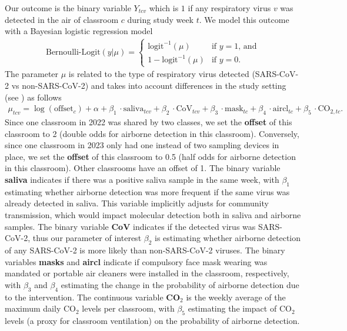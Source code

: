 \documentclass[fleqn,11pt]{wlscirep_supp}
\begin{document}
Our outcome is the binary variable $Y_{tcv}$ which is $1$ if any respiratory virus $v$ was detected in the air of classroom $c$ during study week $t$. We model this outcome with a Bayesian logistic regression model
\begin{align}
    \text{Bernoulli-Logit}(y|\mu) = \begin{cases}
        \text{logit}^{-1}(\mu) & \text{if }y=1\text{, and} \\
        1-\text{logit}^{-1}(\mu) & \text{if }y=0.
    \end{cases}
\end{align}
The parameter $\mu$ is related to the type of respiratory virus detected (SARS-CoV-2 vs non-SARS-CoV-2) and takes into account differences in the study setting (see ) as follows
\begin{align}
    \mu_{tcv} = \log(\text{offset}_c) + \alpha + \beta_1\,\cdot\text{saliva}_{tcv} + \beta_2\,\cdot\text{CoV}_{tcv} + \beta_3\,\cdot\text{mask}_{tc} + \beta_4\,\cdot\text{aircl}_{tc} + \beta_5\,\cdot\text{CO}_{2,tc}.
\end{align}
Since one classroom in 2022 was shared by two classes, we set the \textbf{offset} of this classroom to 2 (double odds for airborne detection in this classroom). Conversely, since one classroom in 2023 only had one instead of two sampling devices in place, we set the \textbf{offset} of this classroom to 0.5 (half odds for airborne detection in this classroom). Other classrooms have an offset of 1. The binary variable \textbf{saliva} indicates if there was a positive saliva sample in the same week, with $\beta_1$ estimating whether airborne detection was more frequent if the same virus was already detected in saliva. This variable implicitly adjusts for community transmission, which would impact molecular detection both in saliva and airborne samples. The binary variable \textbf{CoV} indicates if the detected virus was SARS-CoV-2, thus our parameter of interest $\beta_2$ is estimating whether airborne detection of any SARS-CoV-2 is more likely than non-SARS-CoV-2 viruses. The binary variables \textbf{masks} and \textbf{aircl} indicate if compulsory face mask wearing was mandated or portable air cleaners were installed in the classroom, respectively, with $\beta_3$ and $\beta_4$ estimating the change in the probability of airborne detection due to the intervention. The continuous variable \textbf{CO}$_2$ is the weekly average of the maximum daily CO$_2$ levels per classroom, with $\beta_5$ estimating the impact of CO$_2$ levels (a proxy for classroom ventilation) on the probability of airborne detection.
\end{document}
